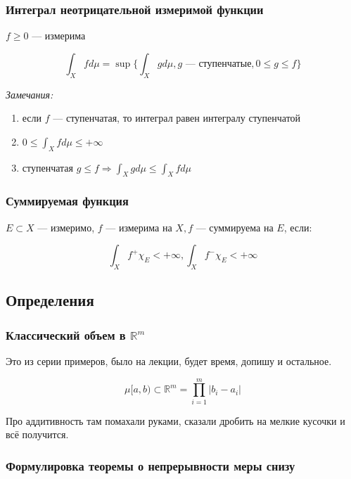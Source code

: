 \documentclass{article}
\begin{document}
\subsubsection{Интеграл неотрицательной измеримой функции}

$f \ge 0$ --- измерима

\[\int_{X} f d \mu = \sup \{\int_{X} g d \mu, g\text{ --- ступенчатые}, 0 \le g \le f\}\]

\textit{Замечания:}

\begin{enumerate}
    \item если $f$ --- ступенчатая, то интеграл равен интегралу ступенчатой
    \item $0 \le \int_{X} f d \mu \le + \infty$
    \item ступенчатая $g \le f \Rightarrow \int_{X} g d \mu \le \int_{X} f d \mu$
\end{enumerate}

\subsubsection{Суммируемая функция}

$E \subset X$ --- измеримо, $f$ --- измерима на $X, f$ --- суммируема на $E$, если:

\[\int_{X} f^{+} \chi_{E} < + \infty, \int_{X} f^{-} \chi_{E} < + \infty\]


\newpage

\subsection{Определения}

\subsubsection{Классический объем в $\mathbb R^m$}

Это из серии примеров, было на лекции, будет время, допишу и остальное.

\[\mu [a, b) \subset \mathbb{R}^m = \prod_{i = 1}^{m} |b_i - a_i|\]

Про аддитивность там помахали руками, сказали дробить на мелкие кусочки и всё получится.

\subsubsection{Формулировка теоремы о непрерывности меры снизу}
\end{document}
